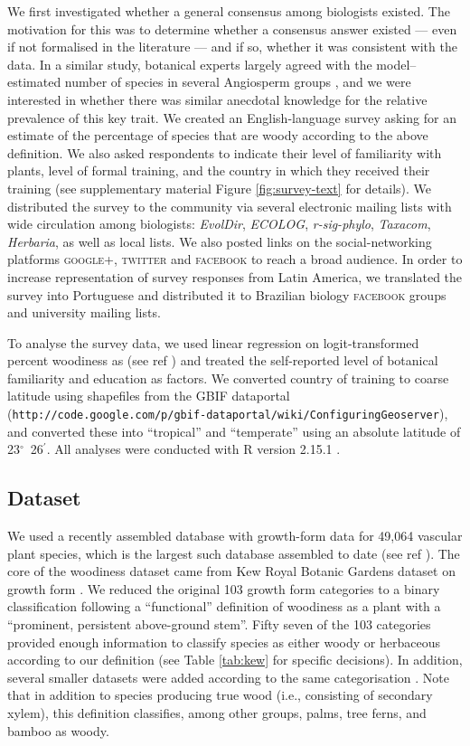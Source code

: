 \documentclass[a4paper,12pt]{article}
\begin{document}
We first investigated whether a general consensus among biologists
existed.  The motivation for this was to determine whether a consensus
answer existed --- even if not formalised in the literature --- and if
so, whether it was consistent with the data.
% 
In a similar study, botanical experts largely agreed with the
model--estimated number of species in several Angiosperm groups
\citep{joppa2010}, and we were interested in whether there was similar
anecdotal knowledge for the relative prevalence of this key trait.
%
We created an English-language survey asking for an estimate of the
percentage of species that are woody according to the above
definition.  We also asked respondents to indicate their level of
familiarity with plants, level of formal training, and the country in
which they received their training (see supplementary material Figure
\ref{fig:survey-text} for details).
%
We distributed the survey to the community via several electronic
mailing lists with wide circulation among biologists: \emph{EvolDir},
\emph{ECOLOG}, \emph{\mbox{r-sig-phylo}}, \emph{Taxacom},
\emph{Herbaria}, as well as local lists. We also posted links on the
social-networking platforms \textsc{google+}, \textsc{twitter} and
\textsc{facebook} to reach a broad audience.
%
In order to increase representation of survey responses from Latin
America, we translated the survey into Portuguese and distributed it
to Brazilian biology \textsc{facebook} groups and university mailing
lists.

To analyse the survey data, we used linear regression on
logit-transformed percent woodiness as (see ref \citep{wartonarcsine})
and treated the self-reported level of botanical familiarity and
education as factors.  We converted country of training to coarse
latitude using shapefiles
from the GBIF dataportal\\
(\texttt{http://code.google.com/p/gbif-dataportal/wiki/ConfiguringGeoserver}),
and converted these into ``tropical'' and ``temperate'' using an
absolute latitude of 23$^\circ$~26$^\prime$.  All analyses were
conducted with R version 2.15.1 \citep{R}.

\subsection{Dataset}

We used a recently assembled database with growth-form data for 49,064
vascular plant species, which is the largest such database assembled
to date (see ref \citep{Zanne}). The core of the woodiness dataset
came from Kew Royal Botanic Gardens dataset on growth form
\citep{Kew}.  We reduced the original 103 growth form categories to a
binary classification following a ``functional'' definition of
woodiness as a plant with a ``prominent, persistent above-ground
stem''.  Fifty seven of the 103 categories provided enough information
to classify species as either woody or herbaceous according to our
definition (see Table \ref{tab:kew} for specific decisions).  In
addition, several smaller datasets were added according to the same
categorisation \citep{Zanne}.  Note that in addition to species
producing true wood (i.e., consisting of secondary xylem), this
definition classifies, among other groups, palms, tree ferns, and
bamboo as woody.
\end{document}
